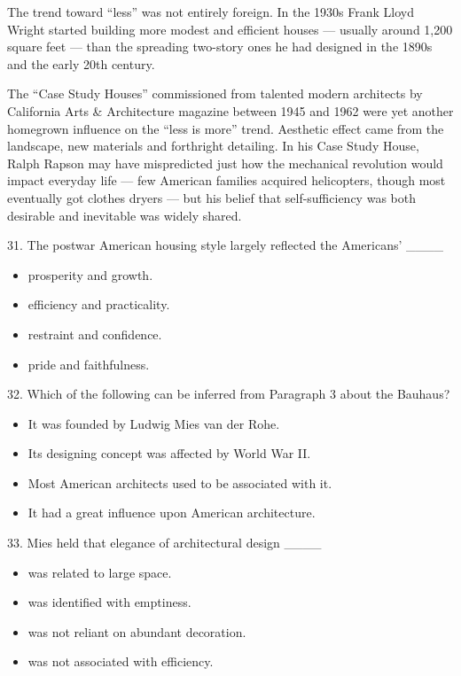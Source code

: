 \documentclass[UTF8,11pt]{ctexart}
\begin{document}
The trend toward “less” was not entirely foreign. In the 1930s Frank Lloyd Wright started building more modest and efficient houses — usually around 1,200 square feet — than the spreading two-story ones he had designed in the 1890s and the early 20th century.


The “Case Study Houses” commissioned from talented modern architects by California Arts \& Architecture magazine between 1945 and 1962 were yet another homegrown influence on the “less is more” trend. Aesthetic effect came from the landscape, new materials and forthright detailing. In his Case Study House, Ralph Rapson may have mispredicted just how the mechanical revolution would impact everyday life — few American families acquired helicopters, though most eventually got clothes dryers — but his belief that self-sufficiency was both desirable and inevitable was widely shared.


31. The postwar American housing style largely reflected the Americans’ \_\_\_\_


\begin{itemize}[leftmargin=2em,itemsep=.2em,topsep=.4em]\item[A.] prosperity and growth.
\item[B.] efficiency and practicality.
\item[C.] restraint and confidence.
\item[D.] pride and faithfulness.
\end{itemize}

32. Which of the following can be inferred from Paragraph 3 about the Bauhaus?


\begin{itemize}[leftmargin=2em,itemsep=.2em,topsep=.4em]\item[A.] It was founded by Ludwig Mies van der Rohe.
\item[B.] Its designing concept was affected by World War II.
\item[C.] Most American architects used to be associated with it.
\item[D.] It had a great influence upon American architecture.
\end{itemize}

33. Mies held that elegance of architectural design \_\_\_\_


\begin{itemize}[leftmargin=2em,itemsep=.2em,topsep=.4em]\item[A.] was related to large space.
\item[B.] was identified with emptiness.
\item[C.] was not reliant on abundant decoration.
\item[D.] was not associated with efficiency.
\end{itemize}
\end{document}
